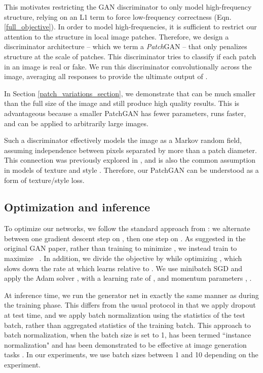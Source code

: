 \documentclass[10pt,twocolumn,letterpaper]{article}
\begin{document}
This motivates restricting the GAN discriminator to only model high-frequency structure, relying on an L1 term to force low-frequency correctness (Eqn. \ref{full_objective}). In order to model high-frequencies, it is sufficient to restrict our attention to the structure in local image patches. Therefore, we design a discriminator architecture -- which we term a \emph{Patch}GAN -- that only penalizes structure at the scale of patches. This discriminator tries to classify if each  patch in an image is real or fake. We run this discriminator convolutionally across the image, averaging all responses to provide the ultimate output of .

In Section \ref{patch_variations_section}, we demonstrate that  can be much smaller than the full size of the image and still produce high quality results. This is advantageous because a smaller PatchGAN has fewer parameters, runs faster, and can be applied to arbitrarily large images.

Such a discriminator effectively models the image as a Markov random field, assuming independence between pixels separated by more than a patch diameter. This connection was previously explored in \cite{li2016precomputed}, and is also the common assumption in models of texture \cite{efros1999texture,gatys2015texture} and style \cite{efros2001image,hertzmann2001image,gatys2015neural,li2016combining}. Therefore, our PatchGAN can be understood as a form of texture/style loss.


\subsection{Optimization and inference}

To optimize our networks, we follow the standard approach from \cite{goodfellow2014generative}: we alternate between one gradient descent step on , then one step on . As suggested in the original GAN paper, rather than training  to minimize , we instead train to maximize ~\cite{goodfellow2014generative}. In addition, we divide the objective by  while optimizing , which slows down the rate at which  learns relative to . We use minibatch SGD and apply the Adam solver \cite{kingma2014adam}, with a learning rate of , and momentum parameters , .

At inference time, we run the generator net in exactly the same manner as during the training phase. This differs from the usual protocol in that we apply dropout at test time, and we apply batch normalization \cite{ioffe2015batch} using the statistics of the test batch, rather than aggregated statistics of the training batch. This approach to batch normalization, when the batch size is set to 1, has been termed ``instance normalization" and has been demonstrated to be effective at image generation tasks \cite{ulyanov2016instance}. In our experiments, we use batch sizes between 1 and 10 depending on the experiment.
\end{document}
